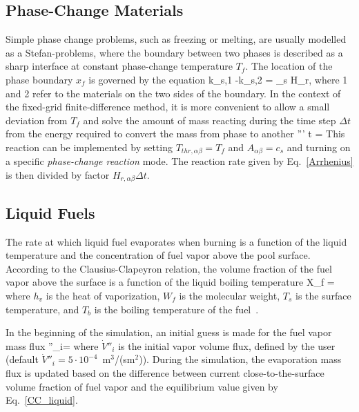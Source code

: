 \subsection{Phase-Change Materials}

Simple phase change problems, such as freezing or melting, are usually modelled as a Stefan-problems,
where the boundary between two phases is described as a sharp interface at constant phase-change temperature $T_f$.
The location of the phase boundary $x_f$ is governed by the equation
\be
k_{s,1} -k_{s,2} = \rho_s H_{r,\alpha\beta} 
\ee
where 1 and 2 refer to the materials on the two sides of the boundary. In the context of the fixed-grid finite-difference method, it is more convenient
to allow a small deviation from $T_f$ and solve the amount of mass reacting during the time step $\Delta t$
from the energy required to convert the mass from phase to another
\be
{}''' \Delta t = 
\ee
This reaction can be implemented by setting $T_{thr,\alpha\beta} = T_f$ and $A_{\alpha\beta} = c_s$ and turning on a specific
{\em phase-change reaction} mode. The reaction rate given by Eq.~\ref{Arrhenius} is then divided by factor $H_{r,\alpha\beta}\Delta t$.

\subsection{Liquid Fuels}

The rate at which liquid fuel evaporates when burning is a function of
the liquid temperature and the concentration of fuel vapor above the
pool surface. According to the Clausius-Clapeyron relation, the volume fraction of the
fuel vapor above the surface is a function of the liquid boiling temperature
\be X_f = \exp {}
\label{CC_liquid}
\ee
where $h_v$ is the heat of vaporization, $W_f$ is the
molecular weight, $T_s$ is the surface temperature, and
$T_b$ is the boiling temperature of the fuel~\cite{Prasad:1}.

In the beginning of the simulation, an initial guess is made for the
fuel vapor mass flux
\be
{}''_i= 
\ee
where $\dot{V}''_i$ is the initial vapor volume flux, defined by the
user (default $\dot{V}''_i = 5\cdot10^{-4}$~m$^3$/(sm$^2$)).
During the simulation, the evaporation mass flux is updated based on
the difference between current close-to-the-surface volume fraction of
fuel vapor and the equilibrium value given by Eq.~\ref{CC_liquid}.

